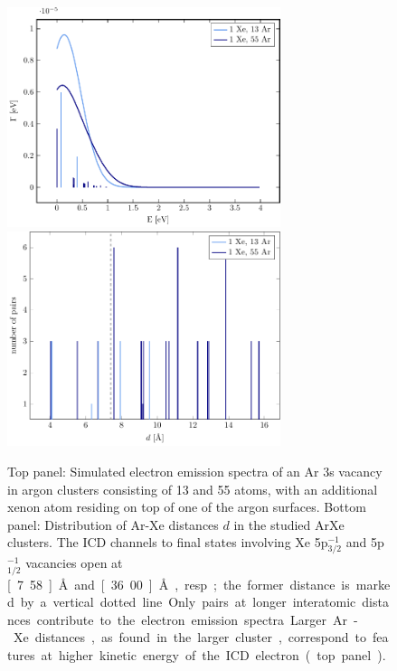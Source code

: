 \begin{figure}[H]
 \centering
 \includegraphics[width=8.0cm]{pics/surf.pdf}\\
 \includegraphics[width=8.0cm]{pics/R_comp.pdf}
 \caption{
 Top panel: Simulated electron emission spectra of an Ar 3s vacancy in 
          argon clusters
          consisting of 13 and 55 atoms, with an additional xenon atom residing
          on top of one of the argon surfaces.
          Bottom panel: Distribution of Ar-Xe distances $d$ in the studied ArXe
          clusters. The ICD channels to final states involving Xe 5p$_{3/2}^{-1}$ and 
          5p$_{1/2}^{-1}$ vacancies open at \unit[7.58]{\AA} and
          \unit[36.00]{\AA}, resp.; the former distance is marked by a vertical dotted line. 
          Only pairs at longer interatomic
          distances contribute to the electron emission spectra.
          Larger Ar-Xe distances, as found in the larger cluster,
          correspond to features at higher kinetic energy of
          the ICD electron (top panel).}
 \label{figure:surf}
\end{figure}




